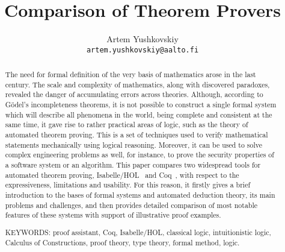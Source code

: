 \documentclass[article]{aaltoseries}
\begin{document}


\title{Comparison of Theorem Provers}

\author{Artem Yushkovskiy
\\\textnormal{\texttt{artem.yushkovskiy@aalto.fi}}}


\maketitle



\begin{abstract}

The need for formal definition of the very basis of mathematics arose in the last century.
The scale and complexity of mathematics, along with discovered paradoxes, revealed the danger of accumulating errors across theories. Although, according to Gödel's incompleteness theorems, it is not possible to construct a single formal system which will describe all phenomena in the world, being complete and consistent at the same time, it gave rise to rather practical areas of logic, such as the theory of automated theorem proving. This is a set of techniques used to verify mathematical statements mechanically using logical reasoning. Moreover, it can be used to solve complex engineering problems as well, for instance, to prove the security properties of a software system or an algorithm.
This paper compares two widespread tools for automated theorem proving, Isabelle/HOL~\cite{tool_Isabelle} and Coq~\cite{tool_Coq}, with respect to the expressiveness, limitations and usability. For this reason, it firstly gives a brief introduction to the bases of formal systems and automated deduction theory, its main problems and challenges, and then provides detailed comparison of most notable features of these systems with support of illustrative proof examples.

\vspace{3mm}
\noindent KEYWORDS: proof assistant, Coq, Isabelle/HOL, classical logic, intuitionistic logic, Calculus of Constructions, proof theory, type theory, formal method, logic.
\end{abstract}

\end{document}
